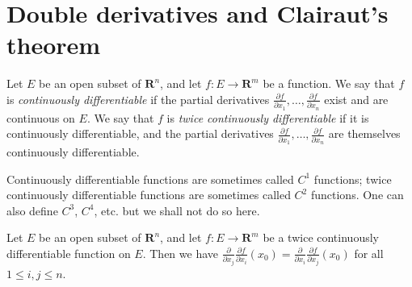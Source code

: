 \section{Double derivatives and Clairaut's theorem}\label{sec 6.5}

\begin{definition}\label{6.5.1}
    Let \(E\) be an open subset of \(\mathbf{R}^n\), and let \(f : E \to \mathbf{R}^m\) be a function.
    We say that \(f\) is \emph{continuously differentiable} if the partial derivatives \(\frac{\partial f}{\partial x_1}, \dots, \frac{\partial f}{\partial x_n}\) exist and are continuous on \(E\).
    We say that \(f\) is \emph{twice continuously differentiable} if it is continuously differentiable, and the partial derivatives \(\frac{\partial f}{\partial x_1}, \dots, \frac{\partial f}{\partial x_n}\) are themselves continuously differentiable.
\end{definition}

\begin{remark}\label{6.5.2}
    Continuously differentiable functions are sometimes called \(C^1\) functions;
    twice continuously differentiable functions are sometimes called \(C^2\) functions.
    One can also define \(C^3\), \(C^4\), etc. but we shall not do so here.
\end{remark}

\setcounter{theorem}{3}
\begin{theorem}\label{6.5.4}
    Let \(E\) be an open subset of \(\mathbf{R}^n\), and let \(f : E \to \mathbf{R}^m\) be a twice continuously differentiable function on \(E\).
    Then we have \(\frac{\partial}{\partial x_j} \frac{\partial f}{\partial x_i}(x_0) = \frac{\partial}{\partial x_i} \frac{\partial f}{\partial x_j}(x_0)\) for all \(1 \leq i, j \leq n\).
\end{theorem}

